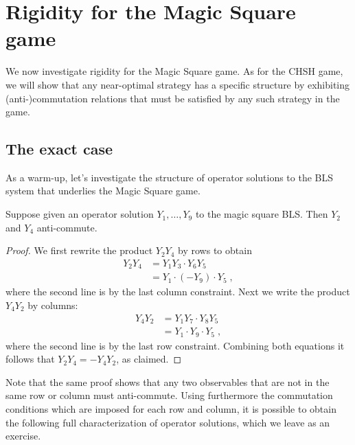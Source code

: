 \section{Rigidity for the Magic Square game}

We now investigate rigidity for the Magic Square game. As for the CHSH game, we will show that any near-optimal strategy has a specific structure by exhibiting (anti-)commutation relations that must be satisfied by any such strategy in the game.

\subsection{The exact case}

 As a warm-up, let's investigate the structure of operator solutions to the BLS system that underlies the Magic Square game. 

\begin{lemma}\label{lem:ms-ac}
Suppose given an operator solution $Y_1,\ldots,Y_9$ to the magic square BLS. Then $Y_2$ and $Y_4$ anti-commute. 
\end{lemma}

\begin{proof}
We first rewrite the product $Y_2Y_4$ by rows to obtain 
\begin{align*}
Y_2 Y_4 &= Y_1 Y_3\cdot   Y_6 Y_5 \\
&= Y_1 \cdot (-Y_9) \cdot Y_5\;,
\end{align*}
where the second line is by the last column constraint. Next we write the product $Y_4 Y_2$ by columns: 
\begin{align*}
Y_4 Y_2 &=  Y_1 Y_7 \cdot Y_8 Y_5  \\
&= Y_1 \cdot Y_9 \cdot Y_5 \;,
\end{align*}
where the second line is by the last row constraint. Combining both equations it follows that $Y_2 Y_4 = -Y_4 Y_2$, as claimed. 
\end{proof}

Note that the same proof shows that any two observables that are not in the same row or column must anti-commute. Using furthermore the commutation conditions which are imposed for each row and column, it is possible to obtain the following full characterization of operator solutions, which we leave as an exercise. 

